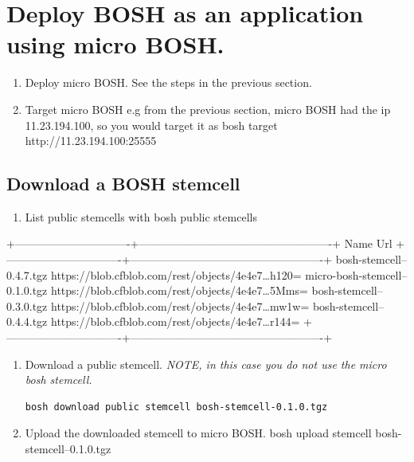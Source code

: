 \section{Deploy BOSH as an application using micro BOSH.}
\label{deployboshasanapplicationusingmicrobosh.}

\begin{enumerate}
\item Deploy micro BOSH. See the steps in the previous section. 

\item Target micro BOSH e.g from the previous section, micro BOSH had the ip 11.23.194.100, so you would target it as bosh target http:/\slash 11.23.194.100:25555

\end{enumerate}

\subsection{Download a BOSH stemcell}
\label{downloadaboshstemcell}

\begin{enumerate}
\item List public stemcells with bosh public stemcells

\end{enumerate}

+-------------------------------+----------------------------------------------------+
\textbar{} Name \textbar{} Url \textbar{}
+-------------------------------+----------------------------------------------------+
\textbar{} bosh-stemcell--0.4.7.tgz \textbar{} https:/\slash blob.cfblob.com\slash rest\slash objects\slash 4e4e7{\ldots}h120= \textbar{}
\textbar{} micro-bosh-stemcell--0.1.0.tgz \textbar{} https:/\slash blob.cfblob.com\slash rest\slash objects\slash 4e4e7{\ldots}5Mms= \textbar{}
\textbar{} bosh-stemcell--0.3.0.tgz \textbar{} https:/\slash blob.cfblob.com\slash rest\slash objects\slash 4e4e7{\ldots}mw1w= \textbar{}
\textbar{} bosh-stemcell--0.4.4.tgz \textbar{} https:/\slash blob.cfblob.com\slash rest\slash objects\slash 4e4e7{\ldots}r144= \textbar{}
+-------------------------------+----------------------------------------------------+

\begin{enumerate}
\item Download a public stemcell. \emph{NOTE, in this case you do not use the micro bosh stemcell.}

\begin{verbatim}
bosh download public stemcell bosh-stemcell-0.1.0.tgz
\end{verbatim}


\item Upload the downloaded stemcell to micro BOSH. bosh upload stemcell bosh-stemcell--0.1.0.tgz

\end{enumerate}


